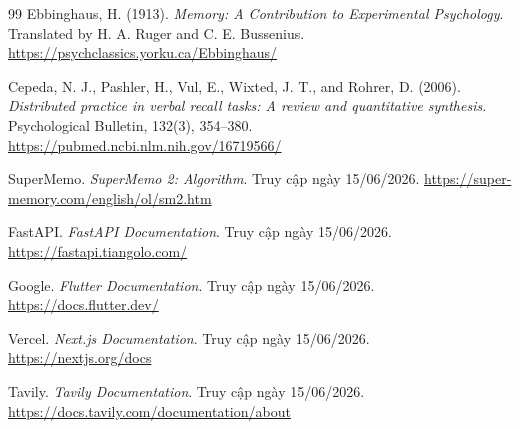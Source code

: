 \documentclass[12pt,a4paper]{report}
\begin{document}
\begin{thebibliography}{99}
Ebbinghaus, H. (1913). \textit{Memory: A Contribution to Experimental Psychology}. Translated by H. A. Ruger and C. E. Bussenius. \url{https://psychclassics.yorku.ca/Ebbinghaus/}

Cepeda, N. J., Pashler, H., Vul, E., Wixted, J. T., and Rohrer, D. (2006). \textit{Distributed practice in verbal recall tasks: A review and quantitative synthesis}. Psychological Bulletin, 132(3), 354--380. \url{https://pubmed.ncbi.nlm.nih.gov/16719566/}

SuperMemo. \textit{SuperMemo 2: Algorithm}. Truy cập ngày 15/06/2026. \url{https://super-memory.com/english/ol/sm2.htm}

FastAPI. \textit{FastAPI Documentation}. Truy cập ngày 15/06/2026. \url{https://fastapi.tiangolo.com/}

Google. \textit{Flutter Documentation}. Truy cập ngày 15/06/2026. \url{https://docs.flutter.dev/}

Vercel. \textit{Next.js Documentation}. Truy cập ngày 15/06/2026. \url{https://nextjs.org/docs}

Tavily. \textit{Tavily Documentation}. Truy cập ngày 15/06/2026. \url{https://docs.tavily.com/documentation/about}

\end{thebibliography}
\end{document}

